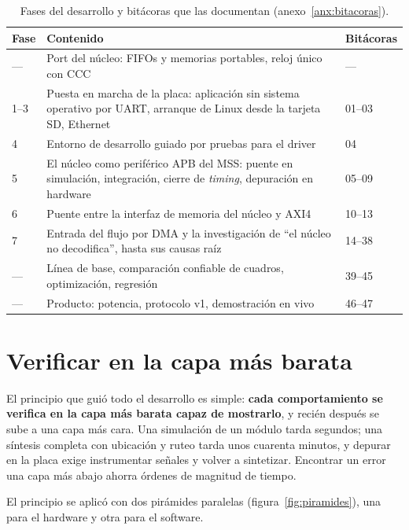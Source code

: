 \begin{table}[ht]
  \centering\small
  \begin{tabularx}{\linewidth}{@{}l X l@{}}
    \toprule
    \textbf{Fase} & \textbf{Contenido} & \textbf{Bitácoras} \\
    \midrule
    --- & Port del núcleo: FIFOs y memorias portables, reloj único con CCC & --- \\
    1--3 & Puesta en marcha de la placa: aplicación sin sistema operativo por
      UART, arranque de Linux desde la tarjeta SD, Ethernet & 01--03 \\
    4 & Entorno de desarrollo guiado por pruebas para el driver & 04 \\
    5 & El núcleo como periférico APB del MSS: puente en simulación,
      integración, cierre de \emph{timing}, depuración en hardware & 05--09 \\
    6 & Puente entre la interfaz de memoria del núcleo y AXI4 & 10--13 \\
    7 & Entrada del flujo por DMA y la investigación de \enquote{el núcleo no
      decodifica}, hasta sus causas raíz & 14--38 \\
    --- & Línea de base, comparación confiable de cuadros, optimización,
      regresión & 39--45 \\
    --- & Producto: potencia, protocolo v1, demostración en vivo & 46--47 \\
    \bottomrule
  \end{tabularx}
  \caption{Fases del desarrollo y bitácoras que las documentan
    (anexo~\ref{anx:bitacoras}).}
  \label{tab:fases}
\end{table}

\section{Verificar en la capa más barata}
\label{sec:capa-barata}

El principio que guió todo el desarrollo es simple: \textbf{cada
comportamiento se verifica en la capa más barata capaz de mostrarlo}, y
recién después se sube a una capa más cara. Una simulación de un módulo
tarda segundos; una síntesis completa con ubicación y ruteo tarda unos
cuarenta minutos, y depurar en la placa exige instrumentar señales y volver a
sintetizar. Encontrar un error una capa más abajo ahorra órdenes de magnitud
de tiempo.

El principio se aplicó con dos pirámides paralelas
(figura~\ref{fig:piramides}), una para el hardware y otra para el software.

